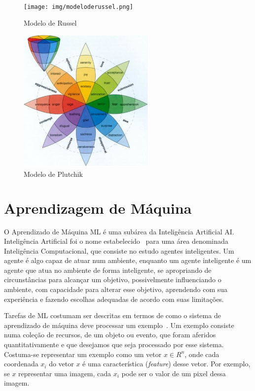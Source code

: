 \begin{figure}[!ht]
\centering
\texttt{[image: img/modeloderussel.png]}
\caption{\label{fig:russel}Modelo de Russel~\cite{img_russel}}
\end{figure}

\begin{figure}[!h]
\centering
\includegraphics[width=0.6\textwidth]{img/plutchik.JPG}
\caption{\label{fig:plutchik}Modelo de Plutchik~\cite{57}}
\end{figure}

\section{Aprendizagem de Máquina}\label{sec:ml}

O Aprendizado de Máquina \acrshort{ML} é uma subárea da Inteligência Artificial \acrfull{AI}. Inteligência Artificial foi o nome estabelecido~\cite{12.23} para uma área denominada Inteligência Computacional, que consiste no estudo agentes inteligentes. Um agente é algo capaz de atuar num ambiente, enquanto um agente inteligente é um agente que atua no ambiente de forma inteligente, se apropriando de circunstâncias para alcançar um objetivo, possivelmente influenciando o ambiente, com capacidade para alterar esse objetivo, aprendendo com sua experiência e fazendo escolhas adequadas de acordo com suas limitações.

Tarefas de \acrshort{ML} costumam ser descritas em termos de como o sistema de aprendizado de máquina deve processar um exemplo~\cite{53}. Um exemplo consiste numa coleção de recursos, de um objeto ou evento, que foram aferidos quantitativamente e que desejamos que seja processado por esse sistema. Costuma-se representar um exemplo como um vetor $x \in R^n$, onde cada coordenada $x_i$ do vetor $x$ é uma característica (\textit{feature}) desse vetor. Por exemplo, se $x$ representar uma imagem, cada $x_i$ pode ser o valor de um pixel dessa imagem.

